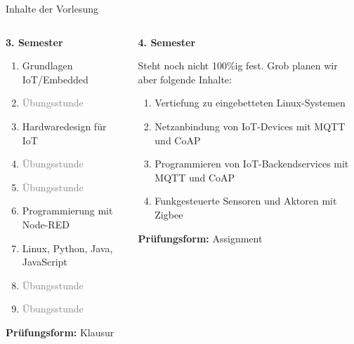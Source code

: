 {
\small
\begin{frame}{Inhalte der Vorlesung}
        \begin{columns}
            \begin{column}[T]{.5\textwidth}
                \textbf{3. Semester}
                \medskip

                \begin{enumerate}
                    \item Grundlagen IoT/Embedded
                    \item \textcolor{gray}{Übungsstunde}
                    \item Hardwaredesign für IoT
                    \item \textcolor{gray}{Übungsstunde}
                    \item \textcolor{gray}{Übungsstunde}
                    \item Programmierung mit Node-RED
                    \item Linux, Python, Java, JavaScript
                    \item \textcolor{gray}{Übungsstunde}
                    \item \textcolor{gray}{Übungsstunde}
                \end{enumerate}

                \medskip
                \textbf{Prüfungsform:} Klausur
            \end{column}
            \begin{column}[T]{.5\textwidth}
                \textbf{4. Semester}
                \medskip

                Steht noch nicht 100\%ig fest. Grob planen wir aber
                folgende Inhalte:
                \medskip

                \begin{enumerate}
                    \item Vertiefung zu eingebetteten Linux-Systemen
                    \item Netzanbindung von IoT-Devices mit MQTT und CoAP
                    \item Programmieren von IoT-Backendservices mit MQTT und CoAP
                    \item Funkgesteuerte Sensoren und Aktoren mit Zigbee
                \end{enumerate}

                \medskip
                \textbf{Prüfungsform:} Assignment
            \end{column}
        \end{columns}
\end{frame}
}

